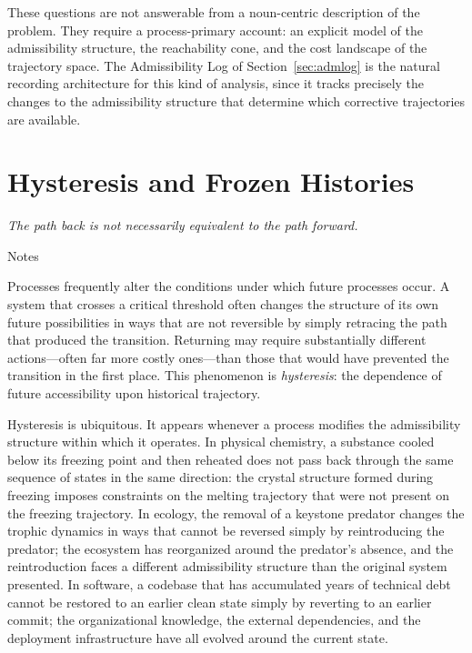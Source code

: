 \documentclass[12pt, a4paper]{article}
\theoremstyle{plain}
\theoremstyle{definition}
\theoremstyle{remark}
\begin{document}
These questions are not answerable from a noun-centric description of the
problem. They require a process-primary account: an explicit model of the
admissibility structure, the reachability cone, and the cost landscape of
the trajectory space. The Admissibility Log of Section~\ref{sec:admlog}
is the natural recording architecture for this kind of analysis, since it
tracks precisely the changes to the admissibility structure that determine
which corrective trajectories are available.

\section{Hysteresis and Frozen Histories}
\label{sec:hysteresis}

\epigraph{\textit{The path back is not necessarily equivalent to the path
forward.}}{Notes}

\noindent
Processes frequently alter the conditions under which future processes occur.
A system that crosses a critical threshold often changes the structure of
its own future possibilities in ways that are not reversible by simply
retracing the path that produced the transition. Returning may require
substantially different actions---often far more costly ones---than those
that would have prevented the transition in the first place. This phenomenon
is \emph{hysteresis}: the dependence of future accessibility upon historical
trajectory.

Hysteresis is ubiquitous. It appears whenever a process modifies the
admissibility structure within which it operates. In physical chemistry,
a substance cooled below its freezing point and then reheated does not
pass back through the same sequence of states in the same direction: the
crystal structure formed during freezing imposes constraints on the melting
trajectory that were not present on the freezing trajectory. In ecology,
the removal of a keystone predator changes the trophic dynamics in ways
that cannot be reversed simply by reintroducing the predator; the ecosystem
has reorganized around the predator's absence, and the reintroduction faces
a different admissibility structure than the original system presented.
In software, a codebase that has accumulated years of technical debt cannot
be restored to an earlier clean state simply by reverting to an earlier
commit; the organizational knowledge, the external dependencies, and the
deployment infrastructure have all evolved around the current state.
\end{document}

